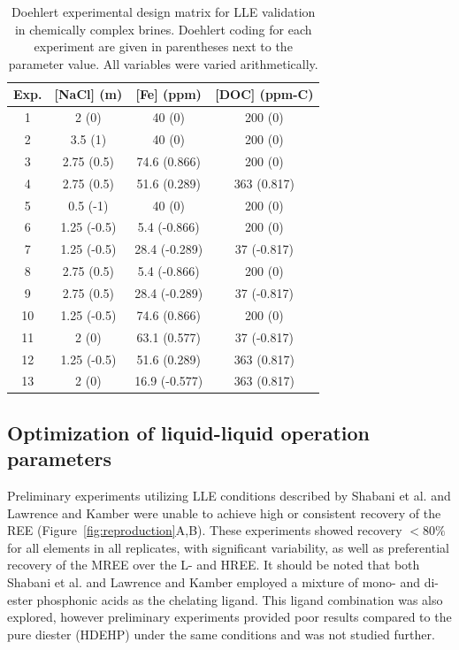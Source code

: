 \begin{table}[htdp]
\caption{Doehlert experimental design matrix for LLE validation in chemically complex brines.
Doehlert coding for each experiment are given in parentheses next to the parameter value.
All variables were varied arithmetically.} \label{tab:Doehlert}
\begin{center}
\begin{tabular}{cccc}
\hline
Exp. & [NaCl] (m) & [Fe] (ppm) & [DOC] (ppm-C) \\ \hline
1 & 2 (0) & 40 (0) & 200 (0) \\ 
2 & 3.5 (1) & 40 (0) & 200 (0) \\ 
3 & 2.75 (0.5) & 74.6 (0.866) & 200 (0) \\ 
4 & 2.75 (0.5) & 51.6 (0.289) & 363 (0.817) \\ 
5 & 0.5 (-1) & 40 (0) & 200 (0) \\ 
6 & 1.25 (-0.5) & 5.4 (-0.866) & 200 (0) \\ 
7 & 1.25 (-0.5) & 28.4 (-0.289) & 37 (-0.817) \\  
8 & 2.75 (0.5) & 5.4 (-0.866) & 200 (0) \\ 
9 & 2.75 (0.5) & 28.4 (-0.289) & 37 (-0.817) \\ 
10 & 1.25 (-0.5) & 74.6 (0.866) & 200 (0) \\ 
11 & 2 (0) & 63.1 (0.577) & 37 (-0.817) \\ 
12 & 1.25 (-0.5) & 51.6 (0.289) & 363 (0.817) \\ 
13 & 2 (0) & 16.9 (-0.577) & 363 (0.817) \\ \hline
\end{tabular}
\end{center}
\label{default}
\end{table}%

\subsection{Optimization of liquid-liquid operation parameters}

Preliminary experiments utilizing LLE conditions described by Shabani et al. \citep{Shabani_AC_1990} and Lawrence and Kamber \citep{Lawrence_GGR_2007} were unable to achieve high or consistent recovery of the REE (Figure~\ref{fig:reproduction}A,B).
These experiments showed recovery $<80\%$ for all elements in all replicates, with significant variability, as well as preferential recovery of the MREE over the L- and HREE.
It should be noted that both Shabani et al. \citep{Shabani_AC_1990} and Lawrence and Kamber \citep{Lawrence_GGR_2007} employed a mixture of mono- and di-ester phosphonic acids as the chelating ligand.
This ligand combination was also explored, however preliminary experiments provided poor results compared to the pure diester (HDEHP) under the same conditions and was not studied further.

